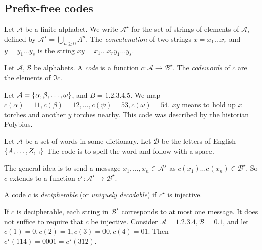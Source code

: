 \subsection{Prefix-free codes}
Let \( \mathcal A \) be a finite alphabet.
We write \( \mathcal A^\star \) for the set of strings of elements of \( \mathcal A \), defined by \( \mathcal A^\star = \bigcup_{n \geq 0} A^n \).
The \emph{concatenation} of two strings \( x = x_1 \dots x_r \) and \( y = y_1 \dots y_s \) is the string \( xy = x_1 \dots x_r y_1 \dots y_s \).
\begin{definition}
    Let \( \mathcal A, \mathcal B \) be alphabets.
    A \emph{code} is a function \( c \colon \mathcal A \to \mathcal B^\star \).
    The \emph{codewords} of \( c \) are the elements of \( \Im c \).
\end{definition}
\begin{example}
    Let \( \mathcal A = \qty{\alpha, \beta, \dots, \omega} \), and \( B = \qty{1, 2, 3, 4, 5} \).
    We map \( c(\alpha) = 11, c(\beta) = 12, \dots, c(\psi) = 53, c(\omega) = 54 \).
    \( xy \) means to hold up \( x \) torches and another \( y \) torches nearby.
    This code was described by the historian Polybius.
\end{example}
\begin{example}
    Let \( \mathcal A \) be a set of words in some dictionary.
    Let \( \mathcal B \) be the letters of English \( \qty{A, \dots, Z, \text{\textvisiblespace}} \)
    The code is to spell the word and follow with a space.
\end{example}
The general idea is to send a message \( x_1, \dots, x_n \in \mathcal A^\star \) as \( c(x_1) \dots c(x_n) \in \mathcal B^\star \).
So \( c \) extends to a function \( c^\star \colon \mathcal A^\star \to \mathcal B^\star \).
\begin{definition}
    A code \( c \) is \emph{decipherable} (or \emph{uniquely decodable}) if \( c^\star \) is injective.
\end{definition}
If \( c \) is decipherable, each string in \( \mathcal B^\star \) corresponds to at most one message.
It does not suffice to require that \( c \) be injective.
Consider \( \mathcal A = \qty{1, 2, 3, 4}, \mathcal B = \qty{0,1} \), and let \( c(1) = 0, c(2) = 1, c(3) = 00, c(4) = 01 \).
Then \( c^\star(114) = 0001 = c^\star(312) \).

